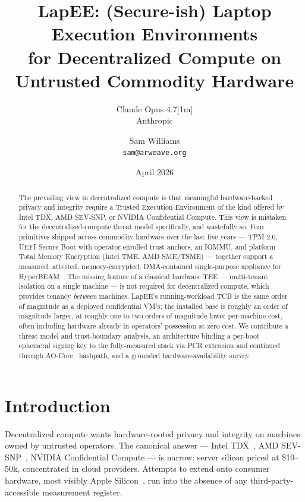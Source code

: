 \documentclass[10pt,a4paper]{article}
\title{\vspace{-3em}\textbf{LapEE: (Secure-ish) Laptop Execution Environments\\for Decentralized Compute on Untrusted Commodity Hardware}}
\author{%
  Claude Opus 4.7[1m]\\\small{Anthropic}
  \and
  Sam Williams\\\small{\texttt{sam@arweave.org}}
}
\date{April 2026}
\begin{document}
\maketitle
\vspace{-1.8em}

\begin{abstract}
\noindent
The prevailing view in decentralized compute is that meaningful hardware-backed
privacy and integrity require a Trusted Execution Environment of the kind
offered by Intel TDX, AMD SEV-SNP, or NVIDIA Confidential Compute. This view
is mistaken for the decentralized-compute threat model specifically, and
wastefully so. Four primitives shipped across commodity hardware over the last
five years --- TPM 2.0, UEFI Secure Boot with operator-enrolled trust anchors,
an IOMMU, and platform Total Memory Encryption (Intel TME, AMD SME/TSME) ---
together support a measured, attested, memory-encrypted, DMA-contained
single-purpose appliance for HyperBEAM~\cite{hyperbeam-repo}. The missing
feature of a classical hardware TEE --- multi-tenant isolation on a single
machine --- is not required for decentralized compute, which provides tenancy
\emph{between} machines. LapEE's running-workload TCB is the same order of
magnitude as a deployed confidential VM's; the installed base is roughly an
order of magnitude larger, at roughly one to two orders of magnitude lower
per-machine cost, often including hardware already in operators' possession
at zero cost. We contribute a threat model and trust-boundary analysis, an
architecture binding a per-boot ephemeral signing key to the fully-measured
stack via PCR extension and continued through AO-Core~\cite{ao-core}
hashpath, and a grounded hardware-availability survey.
\end{abstract}

\vspace{-0.5em}
\section{Introduction}
\vspace{-0.3em}

Decentralized compute wants hardware-rooted privacy and integrity on machines
owned by untrusted operators. The canonical answer --- Intel
TDX~\cite{intel-tdx}, AMD SEV-SNP~\cite{amd-snp}, NVIDIA Confidential Compute
--- is narrow: server silicon priced at \$10--50k, concentrated in cloud
providers. Attempts to extend onto consumer hardware, most visibly Apple
Silicon~\cite{naik-dginf}, run into the absence of any third-party-accessible
measurement register.
\end{document}

